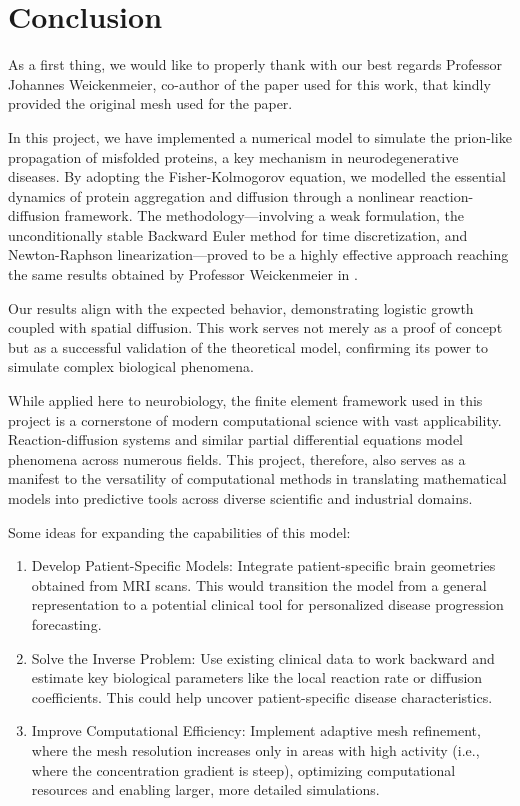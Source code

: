 \documentclass[12pt, a4paper, twoside, openright]{report}
\begin{document}
\chapter{Conclusion}
As a first thing, we would like to properly thank with our best regards Professor Johannes Weickenmeier, co-author of the paper used for this work, that kindly provided the original mesh used for the paper.

In this project, we have implemented a numerical model to simulate the prion-like propagation of misfolded proteins, a key mechanism in neurodegenerative diseases. By adopting the Fisher-Kolmogorov equation, we modelled the essential dynamics of protein aggregation and diffusion through a nonlinear reaction-diffusion framework. The methodology—involving a weak formulation, the unconditionally stable Backward Euler method for time discretization, and Newton-Raphson linearization—proved to be a highly effective approach reaching the same results obtained by Professor Weickenmeier in \cite{WEICKENMEIER2019264}.

Our results align with the expected behavior, demonstrating logistic growth coupled with spatial diffusion. This work serves not merely as a proof of concept but as a successful validation of the theoretical model, confirming its power to simulate complex biological phenomena.

While applied here to neurobiology, the finite element framework used in this project is a cornerstone of modern computational science with vast applicability. Reaction-diffusion systems and similar partial differential equations model phenomena across numerous fields.
This project, therefore, also serves as a manifest to the versatility of computational methods in translating mathematical models into predictive tools across diverse scientific and industrial domains.

Some ideas for expanding the capabilities of this model:

\begin{enumerate}
  \item Develop Patient-Specific Models: Integrate patient-specific brain geometries obtained from MRI scans. This would transition the model from a general representation to a potential clinical tool for personalized disease progression forecasting.
  \item Solve the Inverse Problem: Use existing clinical data to work backward and estimate key biological parameters like the local reaction rate or diffusion coefficients. This could help uncover patient-specific disease characteristics.
  \item Improve Computational Efficiency: Implement adaptive mesh refinement, where the mesh resolution increases only in areas with high activity (i.e., where the concentration gradient is steep), optimizing computational resources and enabling larger, more detailed simulations.
\end{enumerate}

\nocite{*}









\end{document}
